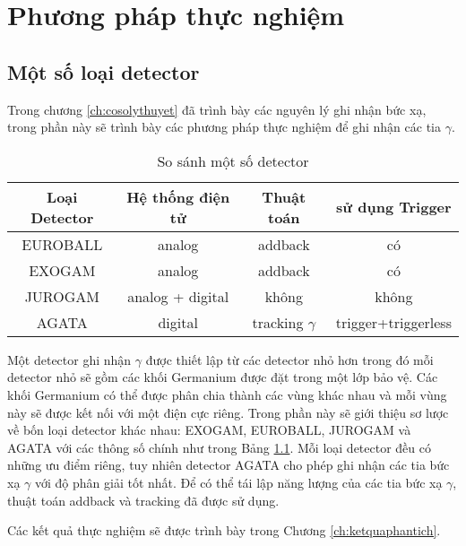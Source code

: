 \chapter{Phương pháp thực nghiệm}
\label{ch:thucnghiem}


\section{Một số loại detector}

Trong chương \ref{ch:cosolythuyet} đã trình bày các nguyên lý ghi nhận bức xạ, trong phần này sẽ trình bày các phương pháp thực nghiệm để ghi nhận các tia $\gamma$.

\begin{table}[!h]
\caption{So sánh một số detector}
\centering
\begin{tabular}{|c|c|c|c|}
\hline 
Loại Detector & Hệ thống điện tử & Thuật toán & sử dụng Trigger \\ 
\hline 
EUROBALL & analog & addback & có \\ 
\hline 
EXOGAM & analog & addback & có \\ 
\hline 
JUROGAM & analog + digital & không & không \\ 
\hline 
AGATA & digital & tracking $\gamma$ & trigger+triggerless \\ 
\hline 
\end{tabular} 
\label{table:detector}
\end{table}

Một detector ghi nhận $\gamma$ được thiết lập từ các detector nhỏ hơn trong đó mỗi detector nhỏ sẽ gồm các khối Germanium được đặt trong một lớp bảo vệ. Các khối Germanium có thể được phân chia thành các vùng khác nhau  và mỗi vùng này sẽ được kết nối với một điện cực riêng. Trong phần này sẽ giới thiệu sơ lược về bốn loại detector khác nhau: EXOGAM, EUROBALL, JUROGAM và AGATA\cite{bib_Bazzaco, bib_Simpson} với các thông số chính như trong Bảng \ref{table:detector}. Mỗi loại detector đều có những ưu điểm riêng, tuy nhiên detector AGATA cho phép ghi nhận các tia bức xạ  $\gamma$ với độ phân giải tốt nhất. Để có thể tái lập năng lượng của các tia bức xạ $\gamma$, thuật toán addback và tracking đã được sử dụng.

Các kết quả thực nghiệm sẽ được trình bày trong Chương \ref{ch:ketquaphantich}.
 


